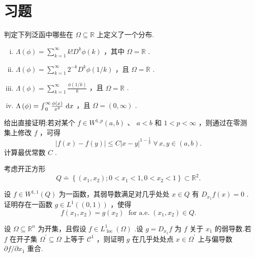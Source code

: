 \section{习题}

\begin{rbhw}[index=1]
判定下列泛函中哪些在 $\Omega  \subseteq  \mathbb{R}$ 上定义了一个分布.
\begin{enumerate}[(i)]
    \item $\Lambda \left( \phi \right)  = \sum_{{k = 1}}^{\infty }k!{D}^{k}\phi \left( k\right)$ ，其中 $\Omega  = \mathbb{R}$ .
    \item $\Lambda \left( \phi \right)  = \sum_{{k = 1}}^{\infty }{2}^{-k}{D}^{k}\phi \left( {1/k}\right)$ ，且 $\Omega  = \mathbb{R}$ .
    \item $\Lambda \left( \phi \right)  = \sum_{{k = 1}}^{\infty }\frac{\phi \left( {1/k}\right) }{k}$ ，且 $\Omega  = \mathbb{R}$ .
    \item $\Lambda \left( \phi \right)  = {\int }_{0}^{\infty }\frac{\phi \left( x\right) }{{x}^{2}}\,\mathop{}\!\mathrm{d} x$ ，且 $\Omega = (0,\infty)$ .
\end{enumerate}
\end{rbhw}

\begin{rbhw}
给出直接证明:若对某个 $f \in  {W}^{1,p}(a,b)$ 、 $a < b$ 和 $1 < p < \infty$ ，则通过在零测集上修改 $f$ ，可得
\[
\left| {f\left( x\right)  - f\left( y\right) }\right|  \leq  C{\left| x - y\right| }^{1 - \frac{1}{p}}\;\forall\,x,y \in  ( a,b) .
\]
计算最优常数 $C$ .
\end{rbhw}

\begin{rbhw}
考虑开正方形
\[
Q \doteq  \left\{  {\left( {{x}_{1},{x}_{2}}\right) ;0 < {x}_{1} < 1,0 < {x}_{2} < 1}\right\}   \subset  {\mathbb{R}}^{2}.
\]

设 $f \in  {W}^{1,1}\left( Q\right)$ 为一函数，其弱导数满足对几乎处处 $x \in  Q$ 有 ${D}_{{x}_{1}}f\left( x\right)  = 0$ .证明存在一函数 $g \in  {L}^{1}\left( \left(  {0,1}\right)  \right)$ ，使得
\[
f\left( {{x}_{1},{x}_{2}}\right)  = g\left( {x}_{2}\right) \;\text{ for a.e. }\left( {{x}_{1},{x}_{2}}\right)  \in  Q.
\]
\end{rbhw}

\begin{rbhw}
设 $\Omega  \subseteq  {\mathbb{R}}^{n}$ 为开集，且假设 $f \in  {L}_{\text{ loc }}^{1}\left( \Omega \right)$ .设 $g = {D}_{{x}_{1}}f$ 为 $f$ 关于 ${x}_{1}$ 的弱导数.若 $f$ 在开子集 ${\Omega }^{\prime } \subseteq  \Omega$ 上等于 ${\mathcal{C}}^{1}$ ，则证明 $g$ 在几乎处处点 $x \in  {\Omega }^{\prime }$ 上与偏导数 $\partial f/\partial {x}_{1}$ 重合.
\end{rbhw}

